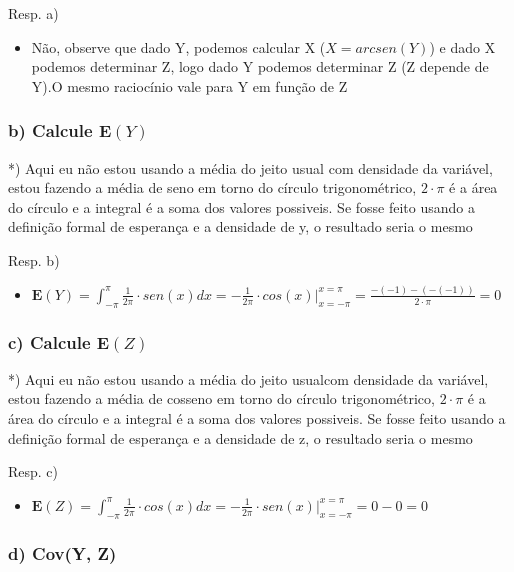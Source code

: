 \documentclass[english]{article}
\begin{document}
Resp. a)
\begin{itemize}
\item Não, observe que dado Y, podemos calcular X ($X=arcsen(Y)$) e dado
X podemos determinar Z, logo dado Y podemos determinar Z (Z depende
de Y).O mesmo raciocínio vale para Y em função de Z
\end{itemize}

\subsubsection*{\textmd{b) Calcule $\mathbf{E}(Y)$}}

{*}) Aqui eu não estou usando a média do jeito usual com densidade
da variável, estou fazendo a média de seno em torno do círculo trigonométrico,
$2\cdot\pi$ é a área do círculo e a integral é a soma dos valores
possiveis. Se fosse feito usando a definição formal de esperança e
a densidade de y, o resultado seria o mesmo



Resp. b)
\begin{itemize}
\item $\mathbf{E}(Y)=\int_{-\pi}^{\pi}\frac{1}{2\pi}\cdot sen(x)dx=-\frac{1}{2\pi}\cdot cos(x)|_{x=-\pi}^{x=\pi}=\frac{-(-1)-(-(-1))}{2\cdot\pi}=0$
\end{itemize}

\subsubsection*{\textmd{c) Calcule $\mathbf{E}(Z)$}}

{*}) Aqui eu não estou usando a média do jeito usualcom densidade
da variável, estou fazendo a média de cosseno em torno do círculo
trigonométrico, $2\cdot\pi$ é a área do círculo e a integral é a
soma dos valores possiveis. Se fosse feito usando a definição formal
de esperança e a densidade de z, o resultado seria o mesmo

Resp. c)
\begin{itemize}
\item $\mathbf{E}(Z)=\int_{-\pi}^{\pi}\frac{1}{2\pi}\cdot cos(x)dx=-\frac{1}{2\pi}\cdot sen(x)|_{x=-\pi}^{x=\pi}=0-0=0$
\end{itemize}

\subsubsection*{\textmd{d) Cov(Y, Z)}}
\end{document}
